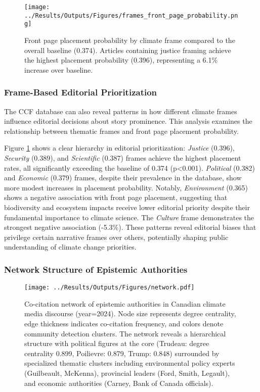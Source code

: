 \documentclass[12pt]{article}
\begin{document}
\begin{figure}[htbp]
\centering
\texttt{[image: ../Results/Outputs/Figures/frames\_front\_page\_probability.png]}
\caption{Front page placement probability by climate frame compared to the overall baseline (0.374). Articles containing justice framing achieve the highest placement probability (0.396), representing a 6.1\% increase over baseline.}
\label{fig:frames_front_page}
\end{figure}

\subsubsection{Frame-Based Editorial Prioritization}

The CCF database can also reveal patterns in how different climate frames influence editorial decisions about story prominence. This analysis examines the relationship between thematic frames and front page placement probability.

Figure \ref{fig:frames_front_page} shows a clear hierarchy in editorial prioritization: \emph{Justice} (0.396), \emph{Security} (0.389), and \emph{Scientific} (0.387) frames achieve the highest placement rates, all significantly exceeding the baseline of 0.374 (p<0.001). \emph{Political} (0.382) and \emph{Economic} (0.379) frames, despite their prevalence in the database, show more modest increases in placement probability. Notably, \emph{Environment} (0.365) shows a negative association with front page placement, suggesting that biodiversity and ecosystem impacts receive lower editorial priority despite their fundamental importance to climate science. The \emph{Culture} frame demonstrates the strongest negative association (-5.3\%). These patterns reveal editorial biases that privilege certain narrative frames over others, potentially shaping public understanding of climate change priorities.

\subsubsection{Network Structure of Epistemic Authorities}

\begin{figure}[t!]
\centering
\texttt{[image: ../Results/Outputs/Figures/network.pdf]}
\caption{Co-citation network of epistemic authorities in Canadian climate media discourse (year=2024). Node size represents degree centrality, edge thickness indicates co-citation frequency, and colors denote community detection clusters. The network reveals a hierarchical structure with political figures at the core (Trudeau: degree centrality 0.899, Poilievre: 0.879, Trump: 0.848) surrounded by specialized thematic clusters including environmental policy experts (Guilbeault, McKenna), provincial leaders (Ford, Smith, Legault), and economic authorities (Carney, Bank of Canada officials).}
\label{fig:network}
\end{figure}
\end{document}
